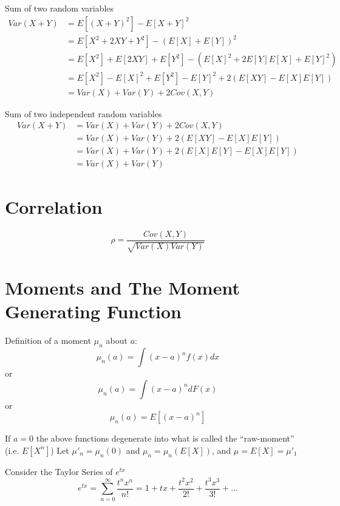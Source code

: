 \documentclass{article}
\begin{document}
Sum of two random variables
\begin{align*}
Var(X+Y) &= E[(X+Y)^2] - E[X+Y]^2\\
&= E[X^2+2XY+Y^2] - (E[X]+E[Y])^2\\
&= E[X^2]+E[2XY]+E[Y^2] - (E[X]^2+2E[Y]E[X]+E[Y]^2)\\
&= E[X^2]-E[X]^2 + E[Y^2]-E[Y]^2 + 2(E[XY] - E[X]E[Y])\\
&= Var(X) + Var(Y) + 2Cov(X,Y)
\end{align*}

Sum of two independent random variables
\begin{align*}
Var(X+Y) &= Var(X) + Var(Y) + 2Cov(X,Y)\\
&= Var(X) + Var(Y) + 2(E[XY] - E[X]E[Y])\\
&= Var(X) + Var(Y) + 2(E[X]E[Y] - E[X]E[Y])\\
&= Var(X) + Var(Y) 
\end{align*}

\section{Correlation}
\begin{equation*}
  \rho=\frac{Cov(X,Y)}{\sqrt{Var(X)Var(Y)}}
\end{equation*}

\section{Moments and The Moment Generating Function}

Definition of a moment $\mu_n$ about $a$:
\begin{equation*}
\mu_n(a) = \int (x-a)^nf(x)dx
\end{equation*}
or
\begin{equation*}
\mu_n(a) = \int (x-a)^ndF(x)
\end{equation*}
or
\begin{equation*}
\mu_n(a) = E[(x-a)^n]
\end{equation*}

If $a=0$ the above functions degenerate into what is called the ``raw-moment'' (i.e. $E[X^n]$)
Let $\mu'_n=\mu_n(0)$ and $\mu_n=\mu_n(E[X])$, and $\mu=E[X]=\mu'_1$


Consider the Taylor Series of $e^{tx}$
\begin{equation*}
  e^{tx}=\sum_{n=0}^{\infty} \frac{t^nx^n}{n!} = 1+tx+\frac{t^2x^2}{2!}+\frac{t^3x^3}{3!}+...
\end{equation*}
\end{document}
